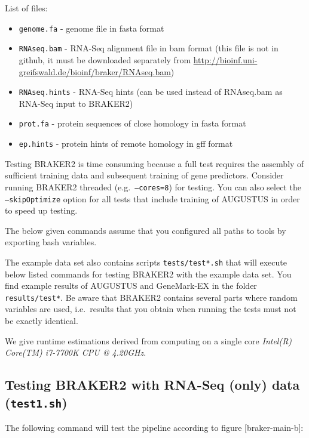 \documentclass[]{article}
\begin{document}
List of files:

\begin{itemize}
\item
  \texttt{genome.fa} - genome file in fasta format
\item
  \texttt{RNAseq.bam} - RNA-Seq alignment file in bam format (this file
  is not in github, it must be downloaded separately from
  \url{http://bioinf.uni-greifswald.de/bioinf/braker/RNAseq.bam})
\item
  \texttt{RNAseq.hints} - RNA-Seq hints (can be used instead of
  RNAseq.bam as RNA-Seq input to BRAKER2)
\item
  \texttt{prot.fa} - protein sequences of close homology in fasta format
\item
  \texttt{ep.hints} - protein hints of remote homology in gff format
\end{itemize}

Testing BRAKER2 is time consuming because a full test requires the
assembly of sufficient training data and subsequent training of gene
predictors. Consider running BRAKER2 threaded (e.g.~\texttt{–cores=8})
for testing. You can also select the \texttt{–skipOptimize} option for
all tests that include training of AUGUSTUS in order to speed up
testing.

The below given commands assume that you configured all paths to tools
by exporting bash variables.

The example data set also contains scripts \texttt{tests/test*.sh} that
will execute below listed commands for testing BRAKER2 with the example
data set. You find example results of AUGUSTUS and GeneMark-EX in the
folder \texttt{results/test*}. Be aware that BRAKER2 contains several
parts where random variables are used, i.e.~results that you obtain when
running the tests must not be exactly identical.

We give runtime estimations derived from computing on a single core
\emph{Intel(R) Core(TM) i7-7700K CPU @ 4.20GHz}.

\hypertarget{testing-braker2-with-rna-seq-only-data-test1.sh}{\subsection{\texorpdfstring{Testing
BRAKER2 with RNA-Seq (only) data
(\texttt{test1.sh})}{Testing BRAKER2 with RNA-Seq (only) data (test1.sh)}}\label{testing-braker2-with-rna-seq-only-data-test1.sh}}

The following command will test the pipeline according to figure
{[}braker-main-b{]}:
\end{document}
